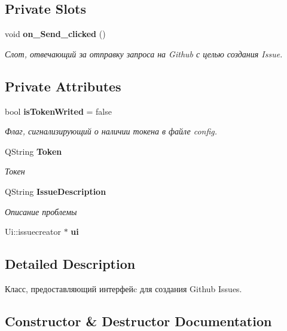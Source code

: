 \subsection*{Private Slots}
\begin{DoxyCompactItemize}
\item 
void \textbf{ on\+\_\+\+Send\+\_\+clicked} ()
\begin{DoxyCompactList}\small\item\em Слот, отвечающий за отправку запроса на Github с целью создания Issue. \end{DoxyCompactList}\end{DoxyCompactItemize}
\subsection*{Private Attributes}
\begin{DoxyCompactItemize}
\item 
bool \textbf{ is\+Token\+Writed} = false
\begin{DoxyCompactList}\small\item\em Флаг, сигнализирующий о наличии токена в файле config. \end{DoxyCompactList}\item 
Q\+String \textbf{ Token}
\begin{DoxyCompactList}\small\item\em Токен \end{DoxyCompactList}\item 
Q\+String \textbf{ Issue\+Description}
\begin{DoxyCompactList}\small\item\em Описание проблемы \end{DoxyCompactList}\item 
Ui\+::issuecreator $\ast$ \textbf{ ui}
\end{DoxyCompactItemize}


\subsection{Detailed Description}
Класс, предоставляющий интерфейc для создания Github Issues. 

\subsection{Constructor \& Destructor Documentation}
\mbox{\label{classissuecreator_af18020b34fc69c9ffea22e7f748b8f96}} 
